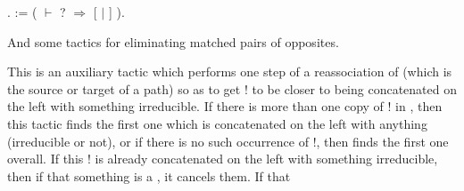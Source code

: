 \documentclass[12pt]{report}
\begin{document}
\begin{coqdoccode}
\coqdocindent{1.00em}
.\coqdoceol
\coqdocemptyline
\coqdocnoindent
{}  :=\coqdoceol
\coqdocindent{1.00em}
 (\coqdoceol
\coqdocindent{2.00em}
  \coqdoceol
\coqdocindent{3.00em}
\ensuremath{\vdash} ?   \ensuremath{\Rightarrow}  [   \ensuremath{|}   ]\coqdoceol
\coqdocindent{2.00em}
\coqdoceol
\coqdocindent{1.00em}
).\coqdoceol
\coqdocemptyline
\end{coqdoccode}
And some tactics for eliminating matched pairs of opposites. \begin{coqdoccode}
\coqdocemptyline
\end{coqdoccode}
This is an auxiliary tactic which performs one step of a
   reassociation of  (which is the source or target of a path) so
   as to get ! to be closer to being concatenated on the left with
   something irreducible.  If there is more than one copy of ! in
   , then this tactic finds the first one which is concatenated on
   the left with anything (irreducible or not), or if there is no such
   occurrence of !, then finds the first one overall.  If this !
   is already concatenated on the left with something irreducible,
   then if that something is a , it cancels them.  If that
\end{document}
